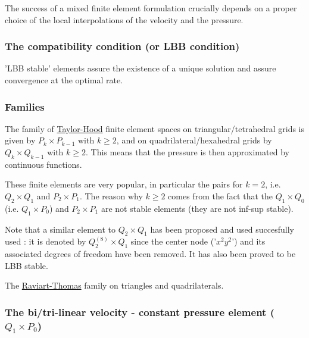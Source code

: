 

The success of a mixed finite element formulation crucially depends on a proper choice of the local interpolations of the velocity and the pressure. 

\subsubsection{The compatibility condition (or LBB condition)}
 

'LBB stable' elements assure the existence of a unique solution 
and assure convergence at the optimal rate. 

\subsubsection{Families}


The family of \underline{Taylor-Hood} finite element spaces on triangular/tetrahedral 
grids is given by $P_k \times P_{k-1}$ with $k\geq 2$, 
and on quadrilateral/hexahedral grids by $Q_k \times Q_{k-1}$ with $k\geq 2$.
This means that the pressure is then approximated by continuous functions. 

These finite elements are very popular, in particular the pairs for $k=2$, i.e.
$Q_2\times Q_1$ and $P_2\times P_1$.
The reason why $k\geq 2$ comes from the fact that the 
$Q_1 \times Q_0$ (i.e. $Q_1 \times P_0$) and $P_2\times P_1$
are not stable elements (they are not inf-sup stable). 

\begin{remark}
Note that a similar element to $Q_2 \times Q_1$ has been proposed
and used succesfully used \cite{taho73,hota74}: it is denoted by $Q_2^{(8)} \times Q_1$ 
since the center node ('$x^2y^2$') and its associated degrees of freedom have been removed. It 
has also been proved to be LBB stable. 
\end{remark}


The \underline{Raviart-Thomas} family on triangles and quadrilaterals.

\subsubsection{The bi/tri-linear velocity - constant pressure element ($Q_1\times P_0$)}

